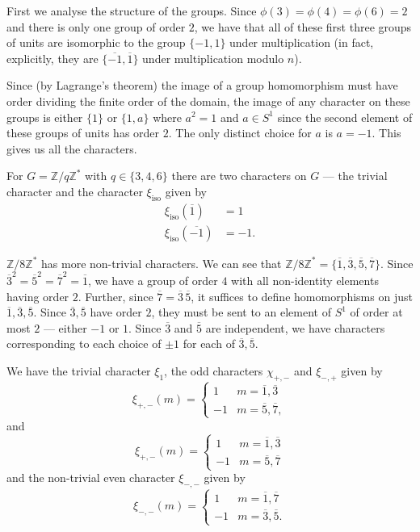 \documentclass[12 pt, letterpaper]{hmcpset}
\begin{document}
\begin{solution}
	First we analyse the structure of the groups. Since $\phi(3) = \phi(4) = \phi(6) = 2$ and there is only one group of order $2$, we have that all of these first three groups of units are isomorphic to the group $\{ -1, 1 \}$ under multiplication (in fact, explicitly, they are $\{ \overline{-1}, \overline{1} \}$ under multiplication modulo $n$).

	Since (by Lagrange's theorem) the image of a group homomorphism must have order dividing the finite order of the domain, the image of any character on these groups is either $\{ 1 \}$ or $\{ 1, a \}$ where $a^{2} = 1$ and $a \in S^{1}$ since the second element of these groups of units has order $2$. The only distinct choice for $a$ is $a = -1$. This gives us all the characters. 

	For $G = \mathbb{Z} / q \mathbb{Z}^{*}$ with $q \in \{ 3, 4, 6 \}$ there are two characters on $G$ --- the trivial character and the character $\xi_{\text{iso}}$ given by
	\begin{align*}
		\xi_{\text{iso}}(\overline{1}) & = 1 \\
		\xi_{\text{iso}}(\overline{-1}) & = -1.
	\end{align*}

	$\mathbb{Z} / 8 \mathbb{Z}^{*}$ has more non-trivial characters. We can see that $\mathbb{Z} / 8 \mathbb{Z}^{*} = \{ \overline{1}, \overline{3}, \overline{5}, \overline{7} \}$. Since $\overline{3}^{2} = \overline{5}^{2} = \overline{7}^{2} = \overline{1}$, we have a group of order $4$ with all non-identity elements having order $2$. Further, since $\overline{7} = \overline{3} \, \overline{5}$, it suffices to define homomorphisms on just $\overline{1}, \overline{3}, \overline{5}$. Since $\overline{3}, \overline{5}$ have order $2$, they must be sent to an element of $S^{1}$ of order at most $2$ --- either $-1$ or $1$. Since $\overline{3}$ and $\overline{5}$ are independent, we have characters corresponding to each choice of $\pm 1$ for each of $\overline{3}, \overline{5}$.

	We have the trivial character $\xi_{1}$, the odd characters $\chi_{+, -}$ and $\xi_{-, +}$ given by
	\[
		\xi_{+, -}(m) = \begin{cases}
			1 & m = \overline{1}, \overline{3} \\
			-1 & m = \overline{5}, \overline{7},
		\end{cases}
	\]
	and
	\[
		\xi_{+, -}(m) = \begin{cases}
			1 & m = \overline{1}, \overline{3} \\
			-1 & m = \overline{5}, \overline{7}
		\end{cases}
	\]
	and the non-trivial even character $\xi_{-, -}$ given by
	\[
		\xi_{-, -}(m) = \begin{cases}
			1 & m = \overline{1}, \overline{7} \\
			-1 & m = \overline{3}, \overline{5}.
		\end{cases}
	\]


\end{solution}
\end{document}

